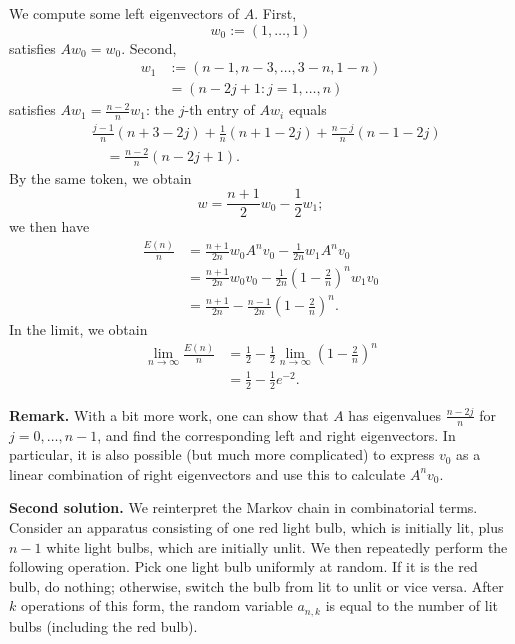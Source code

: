 \documentclass[amssymb,twocolumn,pra,10pt,aps]{revtex4-1}
\begin{document}
\begin{itemize}
We compute some left eigenvectors of $A$. First,
\[
w_0 := (1,\dots,1)
\]
satisfies $Aw_0 = w_0$. Second,
\begin{align*}
w_1 &:= (n-1, n-3, \dots, 3-n, 1-n) \\
&= (n-2j+1\colon j=1,\dots,n)
\end{align*}
satisfies $Aw_1 = \frac{n-2}{n} w_1$: the $j$-th entry of $Aw_i$ equals
\begin{align*}
&\frac{j-1}{n} (n+3-2j) + \frac{1}{n} (n+1-2j) + \frac{n-j}{n} (n-1-2j) \\
&\quad= \frac{n-2}{n} (n-2j+1).
\end{align*}
By the same token, we obtain
\[
w = \frac{n+1}{2} w_0 - \frac{1}{2} w_1;
\]
we then have
\begin{align*}
\frac{E(n)}{n} &= \frac{n+1}{2n} w_0A^n v_0 - \frac{1}{2n} w_1A^n v_0 \\
&= \frac{n+1}{2n} w_0 v_0 - \frac{1}{2n} \left( 1 - \frac{2}{n} \right)^n w_1 v_0  \\
&= \frac{n+1}{2n} - \frac{n-1}{2n} \left( 1 - \frac{2}{n} \right)^n.
\end{align*}
In the limit, we obtain
\begin{align*}
\lim_{n \to \infty} \frac{E(n)}{n} &= \frac{1}{2} - \frac{1}{2} \lim_{n \to \infty} \left( 1 - \frac{2}{n} \right)^n \\
&= \frac{1}{2} - \frac{1}{2} e^{-2}.
\end{align*}

\noindent
\textbf{Remark.}
With a bit more work, one can show that $A$ has eigenvalues
$\frac{n-2j}{n}$ for $j=0,\dots,n-1$, and find the corresponding left and right eigenvectors.
In particular, it is also possible (but much more complicated) to express $v_0$ as a linear combination of right eigenvectors and use this to calculate $A^n v_0$.

\noindent
\textbf{Second solution.} 
We reinterpret the Markov chain in combinatorial terms.
Consider an apparatus consisting of one red light bulb, which is initially lit,
plus $n-1$ white light bulbs, which are initially unlit. 
We then repeatedly perform the following operation. 
Pick one light bulb uniformly at random. If it is the red bulb, do nothing;
otherwise, switch the bulb from lit to unlit or vice versa.
After $k$ operations of this form, the random variable $a_{n,k}$ is equal to the number of lit bulbs (including the red bulb).


\end{itemize}
\end{document}
